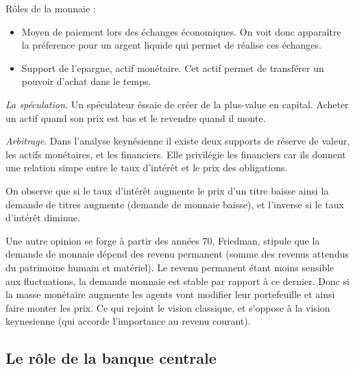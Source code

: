\begin{tcolorbox}[title=La demande de monnaie dans une économie keynésienne simplifiée]
	Rôles de la monnaie : 
	\begin{itemize}
		\item Moyen de paiement lors des échanges économiques. On voit donc apparaître la préference pour un argent liquide qui permet de réalise ces échanges.
		\item Support de l'epargne, actif monétaire. Cet actif permet de transférer un pouvoir d'achat dans le temps.
	\end{itemize}

\emph{La spéculation.} Un spéculateur éssaie de créer de la plus-value en capital. Acheter un actif quand son prix est bas et le revendre quand il monte.

\emph{Arbitrage}. Dans l'analyse keynésienne il existe deux supports de réserve de valeur, les actifs monétaires, et les financiers. Elle privilégie les 
financiers car ils donnent une relation simpe entre le taux d'intérêt et le prix des obligations. 

On observe que si le taux d'intérêt augmente le prix d'un titre baisse ainsi la demande de titres augmente (demande de monnaie baisse), et l'inverse si le taux
d'intérêt diminue.
	
\end{tcolorbox}

Une autre opinion se forge à partir des années 70, Friedman, stipule que la demande de monnaie dépend des revenu permanent (somme des revenus attendus du 
patrimoine humain et matériel). Le revenu permanent étant moins sensible aux fluctuations, la demande monnaie est stable par rapport à ce dernier. 
Donc si la masse monétaire augmente les agents vont modifier leur portefeuille et ainsi faire monter les prix. Ce qui rejoint le vision classique, et 
s'oppose à la vision keynesienne (qui accorde l'importance au revenu courant).





\subsection{Le rôle de la banque centrale} %
\label{sec:le_role_de_la_banque_centrale}

